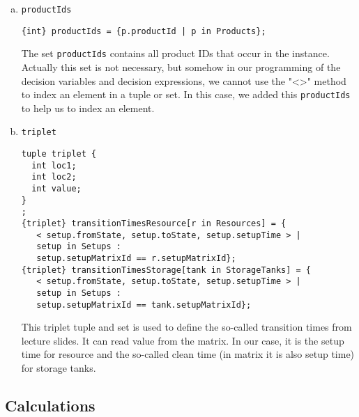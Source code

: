 \documentclass[a4paper, 12pt]{article}
\newcommand{\twoline}{\vspace{2ex}}
\begin{document}
\begin{enumerate}[a.~]
\item \texttt{productIds}
\begin{lstlisting}
{int} productIds = {p.productId | p in Products};
\end{lstlisting}
The set \texttt{productIds} contains all product IDs that occur in the instance. Actually this set is not necessary, but somehow in our programming of the decision variables and decision expressions, we cannot use the "<>" method to index an element in a tuple or set. In this case, we added this \texttt{productIds} to help us to index an element. 
\item \texttt{triplet}
\begin{lstlisting}
tuple triplet {
  int loc1;
  int loc2;
  int value;
}
;
{triplet} transitionTimesResource[r in Resources] = {
   < setup.fromState, setup.toState, setup.setupTime > | 
   setup in Setups :
   setup.setupMatrixId == r.setupMatrixId};
{triplet} transitionTimesStorage[tank in StorageTanks] = {
   < setup.fromState, setup.toState, setup.setupTime > | 
   setup in Setups :
   setup.setupMatrixId == tank.setupMatrixId};
\end{lstlisting}
This triplet tuple and set is used to define the so-called transition times from lecture slides. It can read value from the matrix. In our case, it is the setup time for resource and the so-called clean time (in matrix it is also setup time) for storage tanks. 
\end{enumerate}

\subsection{Calculations}
\twoline 
\end{document}
